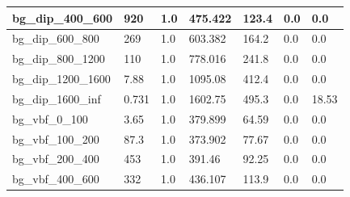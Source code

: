 \documentclass[a4paper, 10pt]{article}
\begin{document}
\begin{table}[H]
\begin{center}
\begin{tabular}{|m{23.0mm}|m{23.0mm}|m{18.0mm}|m{19.0mm}|m{19.0mm}|m{19.0mm}|m{19.0mm}|}
      \hline
      {\cellcolor{white}         bg\_dip\_400\_600}& {\cellcolor{white}         920}& {\cellcolor{white}         1.0}& {\cellcolor{white}         475.422}& {\cellcolor{white}         123.4}& {\cellcolor{green}         0.0}& {\cellcolor{green}         0.0}\\
      \hline
      {\cellcolor{white}         bg\_dip\_600\_800}& {\cellcolor{white}         269}& {\cellcolor{white}         1.0}& {\cellcolor{white}         603.382}& {\cellcolor{white}         164.2}& {\cellcolor{green}         0.0}& {\cellcolor{green}         0.0}\\
      \hline
      {\cellcolor{white}         bg\_dip\_800\_1200}& {\cellcolor{white}         110}& {\cellcolor{white}         1.0}& {\cellcolor{white}         778.016}& {\cellcolor{white}         241.8}& {\cellcolor{green}         0.0}& {\cellcolor{green}         0.0}\\
      \hline
      {\cellcolor{white}         bg\_dip\_1200\_1600}& {\cellcolor{white}         7.88}& {\cellcolor{white}         1.0}& {\cellcolor{white}         1095.08}& {\cellcolor{white}         412.4}& {\cellcolor{green}         0.0}& {\cellcolor{green}         0.0}\\
      \hline
      {\cellcolor{white}         bg\_dip\_1600\_inf}& {\cellcolor{white}         0.731}& {\cellcolor{white}         1.0}& {\cellcolor{white}         1602.75}& {\cellcolor{white}         495.3}& {\cellcolor{red}         0.0}& {\cellcolor{red}         18.53}\\
      \hline
      {\cellcolor{white}         bg\_vbf\_0\_100}& {\cellcolor{white}         3.65}& {\cellcolor{white}         1.0}& {\cellcolor{white}         379.899}& {\cellcolor{white}         64.59}& {\cellcolor{green}         0.0}& {\cellcolor{green}         0.0}\\
      \hline
      {\cellcolor{white}         bg\_vbf\_100\_200}& {\cellcolor{white}         87.3}& {\cellcolor{white}         1.0}& {\cellcolor{white}         373.902}& {\cellcolor{white}         77.67}& {\cellcolor{green}         0.0}& {\cellcolor{green}         0.0}\\
      \hline
      {\cellcolor{white}         bg\_vbf\_200\_400}& {\cellcolor{white}         453}& {\cellcolor{white}         1.0}& {\cellcolor{white}         391.46}& {\cellcolor{white}         92.25}& {\cellcolor{green}         0.0}& {\cellcolor{green}         0.0}\\
      \hline
      {\cellcolor{white}         bg\_vbf\_400\_600}& {\cellcolor{white}         332}& {\cellcolor{white}         1.0}& {\cellcolor{white}         436.107}& {\cellcolor{white}         113.9}& {\cellcolor{green}         0.0}& {\cellcolor{green}         0.0}\\

\end{tabular}
\end{center}
\end{table}
\end{document}
